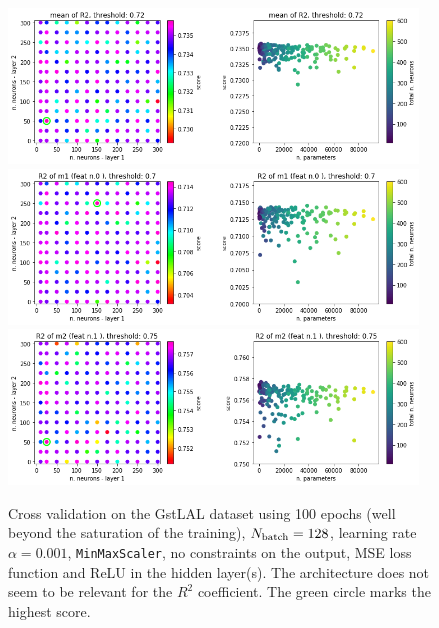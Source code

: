 \documentclass[prd,aps,twocolumn,a4paper,showkeys,nofootinbib]{revtex4-1}
\begin{document}
\begin{figure}[]
  \center
  \includegraphics[width=0.97\textwidth]{./Figs/crossval_GstLAL_R2mean.png}
  \includegraphics[width=0.97\textwidth]{./Figs/crossval_GstLAL_R2m1.png}
  \includegraphics[width=0.97\textwidth]{./Figs/crossval_GstLAL_R2m2.png}
  \caption{\label{fig:crossval_GstLAL} Cross validation on the 
  GstLAL dataset using 100 epochs (well beyond the saturation of the training), $N_{\rm batch}=128$,
  learning rate $\alpha =0.001$, \texttt{MinMaxScaler}, no constraints on the 
  output, MSE loss function and ReLU in the hidden layer(s). The architecture
  does not seem to be relevant for the $R^2$ coefficient. 
  The green circle marks the highest score.}
\end{figure}



\end{document}
